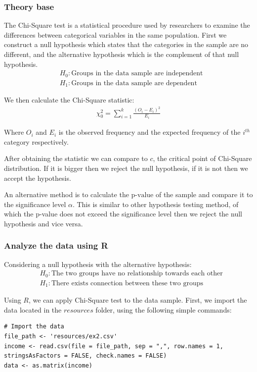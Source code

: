 \documentclass[a4paper]{article}
\numberwithin{equation}{section}
\begin{document}
\subsubsection{Theory base}\label{p2:theory}
The Chi-Square test is a statistical procedure used by researchers to examine the differences between categorical variables in the same population. First we construct a null hypothesis which states that the categories in the sample are no different, and the alternative hypothesis which is the complement of that null hypothesis.
\begin{align*}
   & H_0: \text{Groups in the data sample are independent} \\
   & H_1: \text{Groups in the data sample are dependent}
\end{align*}

We then calculate the Chi-Square statistic:
\begin{align*}
  \chi_0^2 = \sum_{i = 1}^{k} \frac{{(O_i - E_i)}^2}{E_i}
\end{align*}

Where \(O_i\) and \(E_i\) is the observed frequency and the expected frequency of the \(i^{th}\) category respectively.

After obtaining the statistic we can compare to \(c\), the critical point of Chi-Square distribution. If it is bigger then we reject the null hypothesis, if it is not then we accept the hypothesis.

An alternative method is to calculate the \(\text{p-value}\) of the sample and compare it to the significance level \( \alpha \). This is similar to other hypothesis testing method, of which the p-value does not exceed the significance level then we reject the null hypothesis and vice versa.

\subsubsection{Analyze the data using R}
Considering a null hypothesis with the alternative hypothesis:
\begin{align*}
   & H_0 : \text{The two groups have no relationship towards each other} \\
   & H_1 : \text{There exists connection between these two groups}
\end{align*}

Using \(R\), we can apply Chi-Square test to the data sample. First, we import the data located in the \(resources\) folder, using the following simple commands:
\begin{mdframed}[leftline=false,rightline=false,backgroundcolor=magenta!10,nobreak=true]
  \begin{verbatim}
# Import the data
file_path <- 'resources/ex2.csv'
income <- read.csv(file = file_path, sep = ",", row.names = 1, stringsAsFactors = FALSE, check.names = FALSE)
data <- as.matrix(income)
  \end{verbatim}
\end{mdframed}
\end{document}
